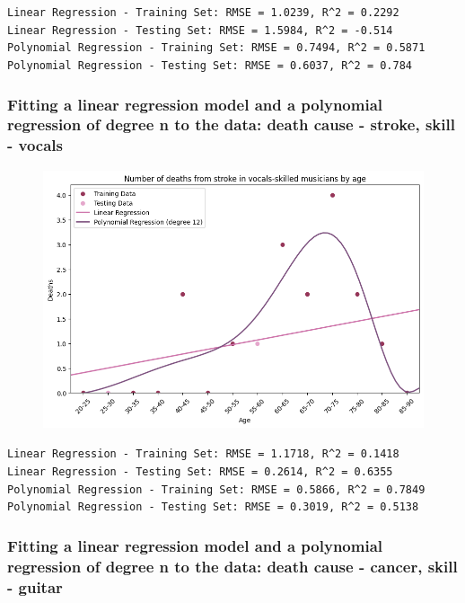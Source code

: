 \documentclass{article}
\begin{document}
\noindent\texttt{Linear Regression - Training Set: RMSE = 1.0239, R\textasciicircum2 = 0.2292\\
Linear Regression - Testing Set: RMSE = 1.5984, R\textasciicircum2 = -0.514\\
Polynomial Regression - Training Set: RMSE = 0.7494, R\textasciicircum2 = 0.5871\\
Polynomial Regression - Testing Set: RMSE = 0.6037, R\textasciicircum2 = 0.784\\}



\subsubsection{Fitting a linear regression model and a polynomial regression of degree n to the data: death cause - stroke, skill - vocals}

\begin{figure} [H]
    \centering
    \includegraphics[width=0.6\linewidth]{graph_images/experiments/exp7.png}
    \label{fig:enter-label}
\end{figure}

\noindent\texttt{Linear Regression - Training Set: RMSE = 1.1718, R\textasciicircum2 = 0.1418\\
Linear Regression - Testing Set: RMSE = 0.2614, R\textasciicircum2 = 0.6355\\
Polynomial Regression - Training Set: RMSE = 0.5866, R\textasciicircum2 = 0.7849\\
Polynomial Regression - Testing Set: RMSE = 0.3019, R\textasciicircum2 = 0.5138\\}



\subsubsection{Fitting a linear regression model and a polynomial regression of degree n to the data: death cause - cancer, skill - guitar}
\end{document}
